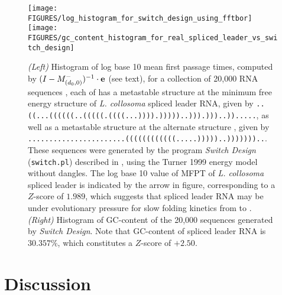 \begin{figure}[!tbph]
\begin{center}
\texttt{[image: FIGURES/log\_histogram\_for\_switch\_design\_using\_fftbor]}
\texttt{[image: FIGURES/gc\_content\_histogram\_for\_real\_spliced\_leader\_vs\_switch\_design]}
\caption{\small
{\em (Left)}
Histogram of log base 10 mean first passage times,
computed by $(I - M^{-}_{(d_0,0)})^{-1} \cdot {\bf e}$ (see text),
for a collection of 20,000 RNA sequences \seq, each of has a metastable
structure at the minimum free energy structure \strA of
{\em L. collosoma} spliced leader RNA, given by
{\tiny \tt ..((...((((((..(((((.((((...)))).)))))..))).)))..)).....},
as well as a metastable structure at the alternate structure \strB,
given by
{\tiny \tt .......................((((((((((((.....)))))..)))))))..}.
These sequences were generated by the program {\em Switch Design}
({\tt switch.pl}) described in \citep{Flamm.r01}, using the Turner 1999
energy model without dangles.
The log base 10 value of MFPT of {\em L. collosoma} spliced leader
is indicated by the arrow in figure, corresponding to a $Z$-score of
$1.989$, which suggests
that spliced leader RNA may be under evolutionary pressure
for slow folding kinetics from \strA to \strB.
{\em (Right)} Histogram of GC-content of the 20,000 sequences generated
by {\em Switch Design}. Note that GC-content of spliced leader RNA is
$30.357\%$, which constitutes a $Z$-score of
$+2.50$.
}
\end{center}
\label{fig:histogramMFPT}
\end{figure}



\section{Discussion}
\label{section:discussion}

